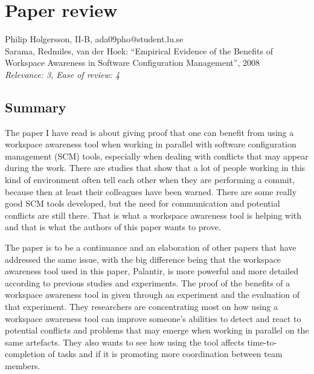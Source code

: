 \documentclass[a4paper]{article}
\begin{document}
\section*{Paper review}

Philip Holgersson, II-B, ada09pho@student.lu.se\\
Sarama, Redmiles, van der Hoek: ``Empirical Evidence of the Benefits of Workspace Awareness in Software Configuration Management'', 2008 \\
\textit{Relevance: 3, Ease of review: 4}

\subsection*{Summary}

The paper I have read is about giving proof that one can benefit from using a workspace awareness tool when working in parallel with software configuration management (SCM) tools, especially when dealing with conflicts that may appear during the work. There are studies that show that a lot of people working in this kind of environment often tell each other when they are performing a commit, because then at least their colleagues have been warned. There are some really good SCM tools developed, but the need for communication and potential conflicts are still there. That is what a workspace awareness tool is helping with and that is what the authors of this paper wants to prove.

The paper is to be a continuance and an elaboration of other papers that have addressed the same issue, with the big difference being that the workspace awareness tool used in this paper, Palantir,  is more powerful and more detailed according to previous studies and experiments.
The proof of the benefits of a workspace awareness tool in given through an experiment and the evaluation of that experiment. They researchers are concentrating most on how using a workspace awareness tool can improve someone's abilities to detect and react to potential conflicts and problems that may emerge when working in parallel on the same artefacts. They also wants to see how using the tool affects time-to-completion of tasks and if it is promoting more coordination between team members.
\end{document}
